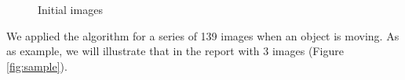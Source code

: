 \documentclass{article}
\begin{document}
\begin{figure}[H]
	  \centering
		  \hspace{0.1cm}
	  \caption{Initial images}
	  \label{fig:template}
\end{figure}

	We applied the algorithm for a series of 139 images when an object is moving. As as example, we will illustrate that in the report with 3 images (Figure \ref{fig:sample}).
\end{document}
